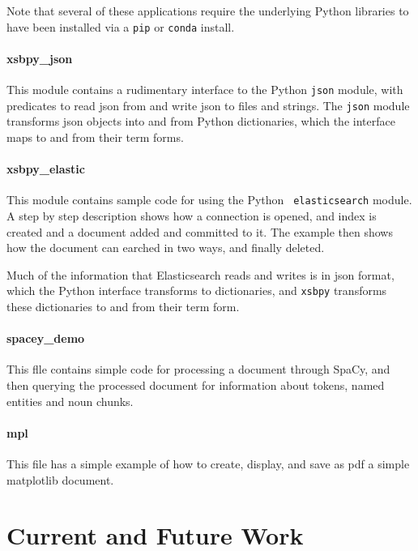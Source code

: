 Note that several of these applications require the underlying Python
libraries to have been installed via a {\tt pip} or {\tt conda}
install.

\paragraph{xsbpy\_json}
This module contains a rudimentary interface to the Python {\tt json}
module, with predicates to read json from and write json to files and
strings.  The {\tt json} module transforms json objects into and from Python
dictionaries, which the interface maps to and from their term forms.

\paragraph{xsbpy\_elastic}
This module contains sample code for using the Python {\tt
  elasticsearch} module.  A step by step description shows how a
connection is opened, and index is created and a document added and
committed to it.  The example then shows how the document can earched
in two ways, and finally deleted.

Much of the information that Elasticsearch reads and writes is in json
format, which the Python interface transforms to dictionaries, and
{\tt xsbpy} transforms these dictionaries to and from their term form.

\paragraph{spacey\_demo}
This flle contains simple code for processing a document through
SpaCy, and then querying the processed document for information about
tokens, named entities and noun chunks.

\paragraph{mpl}
This file has a simple example of how to create, display, and save as
pdf a simple matplotlib document.

\section{Current and Future Work}

